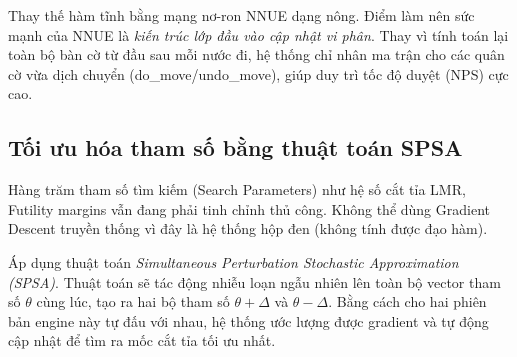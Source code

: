 Thay thế hàm tĩnh bằng mạng nơ-ron NNUE dạng nông. Điểm làm nên sức mạnh của NNUE là \textit{kiến trúc lớp đầu vào cập nhật vi phân}. Thay vì tính toán lại toàn bộ bàn cờ từ đầu sau mỗi nước đi, hệ thống chỉ nhân ma trận cho các quân cờ vừa dịch chuyển (do\_move/undo\_move), giúp duy trì tốc độ duyệt (NPS) cực cao.


\subsection{Tối ưu hóa tham số bằng thuật toán SPSA}

Hàng trăm tham số tìm kiếm (Search Parameters) như hệ số cắt tỉa LMR, Futility margins vẫn đang phải tinh chỉnh thủ công. Không thể dùng Gradient Descent truyền thống vì đây là hệ thống hộp đen (không tính được đạo hàm).

Áp dụng thuật toán \textit{Simultaneous Perturbation Stochastic Approximation (SPSA)}. Thuật toán sẽ tác động nhiễu loạn ngẫu nhiên lên toàn bộ vector tham số $\theta$ cùng lúc, tạo ra hai bộ tham số $\theta + \Delta$ và $\theta - \Delta$. Bằng cách cho hai phiên bản engine này tự đấu với nhau, hệ thống ước lượng được gradient và tự động cập nhật để tìm ra mốc cắt tỉa tối ưu nhất.

